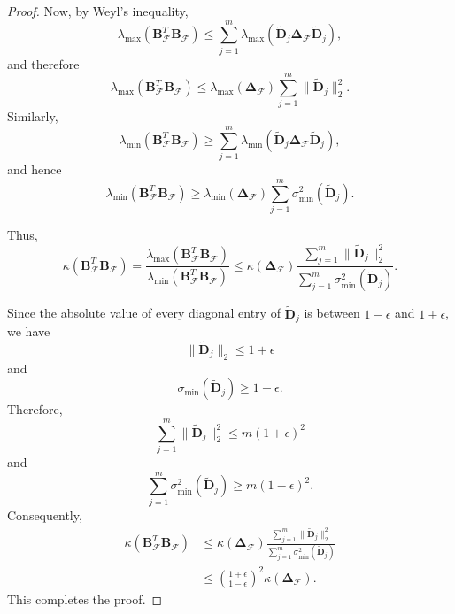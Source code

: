 \documentclass[journal,draftcls,onecolumn]{IEEEtran}
\theoremstyle{mystyle}
\begin{document}
\begin{proof}
Now, by Weyl's inequality,
\[
\lambda_{\max}
\!\left(
\mathbf{B}_{\mathcal F}^{T}
\mathbf{B}_{\mathcal F}
\right)
\le
\sum_{j=1}^{m}
\lambda_{\max}
\!\left(
\tilde{\mathbf{D}}_j
\mathbf{\Delta}_{\mathcal F}
\tilde{\mathbf{D}}_j
\right),
\]
and therefore
\[
\lambda_{\max}
\!\left(
\mathbf{B}_{\mathcal F}^{T}
\mathbf{B}_{\mathcal F}
\right)
\le
\lambda_{\max}(\mathbf{\Delta}_{\mathcal F})
\sum_{j=1}^{m}\|\tilde{\mathbf{D}}_j\|_2^2.
\]
Similarly,
\[
\lambda_{\min}
\!\left(
\mathbf{B}_{\mathcal F}^{T}
\mathbf{B}_{\mathcal F}
\right)
\ge
\sum_{j=1}^{m}
\lambda_{\min}
\!\left(
\tilde{\mathbf{D}}_j
\mathbf{\Delta}_{\mathcal F}
\tilde{\mathbf{D}}_j
\right),
\]
and hence
\[
\lambda_{\min}
\!\left(
\mathbf{B}_{\mathcal F}^{T}
\mathbf{B}_{\mathcal F}
\right)
\ge
\lambda_{\min}(\mathbf{\Delta}_{\mathcal F})
\sum_{j=1}^{m}\sigma_{\min}^2(\tilde{\mathbf{D}}_j).
\]

Thus,
\[
\kappa
\!\left(
\mathbf{B}_{\mathcal F}^{T}
\mathbf{B}_{\mathcal F}
\right)
=
\frac{
\lambda_{\max}
\!\left(
\mathbf{B}_{\mathcal F}^{T}
\mathbf{B}_{\mathcal F}
\right)
}{
\lambda_{\min}
\!\left(
\mathbf{B}_{\mathcal F}^{T}
\mathbf{B}_{\mathcal F}
\right)
}
\le
\kappa(\mathbf{\Delta}_{\mathcal F})
\frac{
\sum_{j=1}^{m}\|\tilde{\mathbf{D}}_j\|_2^2
}{
\sum_{j=1}^{m}\sigma_{\min}^2(\tilde{\mathbf{D}}_j)
}.
\]

Since the absolute value of every diagonal entry of $\tilde{\mathbf{D}}_j$ is between $1-\epsilon$ and $1+\epsilon$, we have
$$
\|\tilde{\mathbf{D}}_j\|_2\leq 1+\epsilon
$$
and
$$
\sigma_{\min}(\tilde{\mathbf{D}}_j)\geq 1-\epsilon.
$$
Therefore,
$$
\sum_{j=1}^{m}\|\tilde{\mathbf{D}}_j\|_2^2
\leq
m(1+\epsilon)^2
$$
and
$$
\sum_{j=1}^{m}\sigma_{\min}^2(\tilde{\mathbf{D}}_j)
\geq
m(1-\epsilon)^2.
$$
Consequently,
$$
\begin{aligned}
\kappa\left(\mathbf{B}_{\mathcal{F}}^T
\mathbf{B}_{\mathcal{F}}\right)
&\leq
\kappa\left(\mathbf{\Delta}_{\mathcal{F}}\right)
\frac{
\sum_{j=1}^{m}\|\tilde{\mathbf{D}}_j\|_2^2
}{
\sum_{j=1}^{m}\sigma_{\min}^2(\tilde{\mathbf{D}}_j)
}\\
&\leq
\left(\frac{1+\epsilon}{1-\epsilon}\right)^2
\kappa\left(\mathbf{\Delta}_{\mathcal{F}}\right).
\end{aligned}
$$
This completes the proof.






\end{proof}
\end{document}
